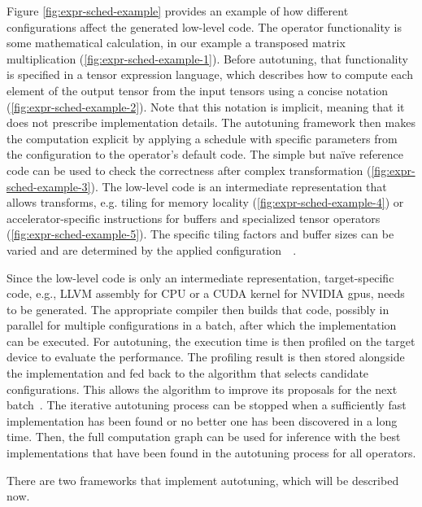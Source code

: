 Figure \ref{fig:expr-sched-example} provides an example of how different configurations affect the generated low-level code. The operator functionality is some mathematical calculation, in our example a transposed matrix multiplication (\ref{fig:expr-sched-example-1}). Before autotuning, that functionality is specified in a tensor expression language, which describes how to compute each element of the output tensor from the input tensors using a concise notation (\ref{fig:expr-sched-example-2}). Note that this notation is implicit, meaning that it does not prescribe implementation details. The autotuning framework then makes the computation explicit by applying a schedule with specific parameters from the configuration to the operator's default code. The simple but naïve reference code can be used to check the correctness after complex transformation (\ref{fig:expr-sched-example-3}). The low-level code is an intermediate representation that allows transforms, e.g. tiling for memory locality (\ref{fig:expr-sched-example-4}) or accelerator-specific instructions for buffers and specialized tensor operators (\ref{fig:expr-sched-example-5}). The specific tiling factors and buffer sizes can be varied and are determined by the applied configuration~\cite[p.~4~ff.]{Chen.2018b}~\cite[p.~9~ff.]{Vasilache.2018}.

Since the low-level code is only an intermediate representation, target-specific code, e.g., LLVM assembly for CPU or a CUDA kernel for NVIDIA \glspl{gpu}, needs to be generated. The appropriate compiler then builds that code, possibly in parallel for multiple configurations in a batch, after which the implementation can be executed. For autotuning, the execution time is then profiled on the target device to evaluate the performance. The profiling result is then stored alongside the implementation and fed back to the algorithm that selects candidate configurations. This allows the algorithm to improve its proposals for the next batch~\cite[p.~15~f.]{Vasilache.2018}. The iterative autotuning process can be stopped when a sufficiently fast implementation has been found or no better one has been discovered in a long time. Then, the full computation graph can be used for inference with the best implementations that have been found in the autotuning process for all operators.

There are two frameworks that implement autotuning, which will be described now.

